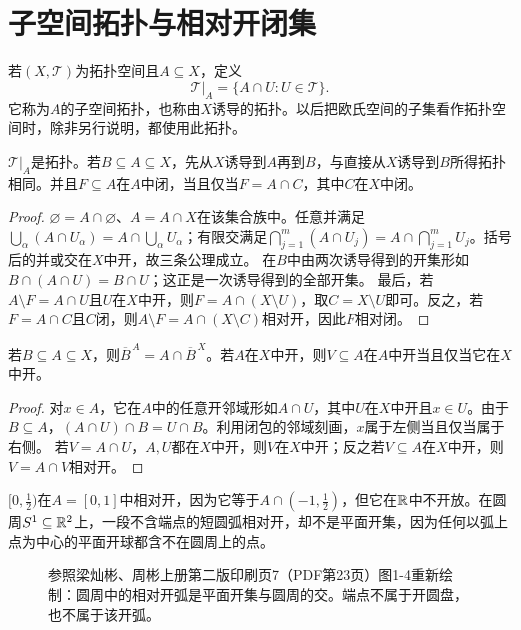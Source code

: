\section{子空间拓扑与相对开闭集}
\begin{definition}[子空间拓扑]
若$(X,\mathcal T)$为拓扑空间且$A\subseteq X$，定义
\[
\mathcal T|_A=\{A\cap U:U\in\mathcal T\}.
\]
它称为$A$的子空间拓扑，也称由$X$诱导的拓扑。以后把欧氏空间的子集看作拓扑空间时，除非另行说明，都使用此拓扑。
\end{definition}
\begin{theorem}[子空间拓扑的合法性与传递性]\label{thm:subspace}
$\mathcal T|_A$是拓扑。若$B\subseteq A\subseteq X$，先从$X$诱导到$A$再到$B$，与直接从$X$诱导到$B$所得拓扑相同。并且$F\subseteq A$在$A$中闭，当且仅当$F=A\cap C$，其中$C$在$X$中闭。
\end{theorem}
\begin{proof}
$\varnothing=A\cap\varnothing$、$A=A\cap X$在该集合族中。任意并满足$\bigcup_\alpha(A\cap U_\alpha)=A\cap\bigcup_\alpha U_\alpha$；有限交满足$\bigcap_{j=1}^m(A\cap U_j)=A\cap\bigcap_{j=1}^mU_j$。括号后的并或交在$X$中开，故三条公理成立。
在$B$中由两次诱导得到的开集形如$B\cap(A\cap U)=B\cap U$；这正是一次诱导得到的全部开集。
最后，若$A\setminus F=A\cap U$且$U$在$X$中开，则$F=A\cap(X\setminus U)$，取$C=X\setminus U$即可。反之，若$F=A\cap C$且$C$闭，则$A\setminus F=A\cap(X\setminus C)$相对开，因此$F$相对闭。
\end{proof}
\begin{theorem}[子空间闭包与开子空间]
若$B\subseteq A\subseteq X$，则$\overline B^{\,A}=A\cap\overline B^{\,X}$。若$A$在$X$中开，则$V\subseteq A$在$A$中开当且仅当它在$X$中开。
\end{theorem}
\begin{proof}
对$x\in A$，它在$A$中的任意开邻域形如$A\cap U$，其中$U$在$X$中开且$x\in U$。由于$B\subseteq A$，$(A\cap U)\cap B=U\cap B$。利用闭包的邻域刻画，$x$属于左侧当且仅当属于右侧。
若$V=A\cap U$，$A,U$都在$X$中开，则$V$在$X$中开；反之若$V\subseteq A$在$X$中开，则$V=A\cap V$相对开。
\end{proof}
\begin{example}[相对开不等于环境中开]
$[0,\tfrac12)$在$A=[0,1]$中相对开，因为它等于$A\cap(-1,\tfrac12)$，但它在$\mathbb{R}$中不开放。在圆周$S^1\subseteq\mathbb{R}^2$上，一段不含端点的短圆弧相对开，却不是平面开集，因为任何以弧上点为中心的平面开球都含不在圆周上的点。
\end{example}
\begin{figure}[htbp]
\centering

\caption{参照梁灿彬、周彬上册第二版印刷页7（PDF第23页）图1-4重新绘制：圆周中的相对开弧是平面开集与圆周的交。端点不属于开圆盘，也不属于该开弧。}
\end{figure}

